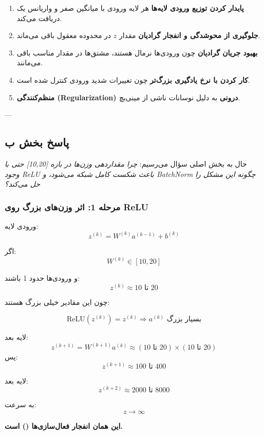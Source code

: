 \documentclass{article}
\begin{document}
\begin{enumerate}
	\item \textbf{پایدار کردن توزیع ورودی لایه‌ها}  
	هر لایه ورودی با میانگین صفر و واریانس یک دریافت می‌کند.
	
	\item \textbf{جلوگیری از محوشدگی و انفجار گرادیان}  
	مقدار $z$ در محدوده معقول باقی می‌ماند.
	
	\item \textbf{بهبود جریان گرادیان}  
	چون ورودی‌ها نرمال هستند، مشتق‌ها در مقدار مناسب باقی می‌مانند.
	
	\item \textbf{کار کردن با نرخ یادگیری بزرگ‌تر}  
	چون تغییرات شدید ورودی کنترل شده است.
	
	\item \textbf{منظم‌کنندگی (Regularization) درونی}  
	به دلیل نوسانات ناشی از مینی‌بچ.
\end{enumerate}

---

\subsection{پاسخ بخش ب}

حال به بخش اصلی سؤال می‌رسیم:  
\emph{چرا مقداردهی وزن‌ها در بازه [10,20] حتی با وجود ReLU باعث شکست کامل شبکه می‌شود، و BatchNorm چگونه این مشکل را حل می‌کند؟}

\subsubsection*{مرحله 1: اثر وزن‌های بزرگ روی ReLU}

ورودی لایه:
\[
z^{(k)} = W^{(k)} a^{(k-1)} + b^{(k)}
\]

اگر:
\[
W^{(k)} \in [10,20]
\]

و ورودی‌ها حدود 1 باشند:
\[
z^{(k)} \approx 10 \text{ تا } 20
\]

چون این مقادیر خیلی بزرگ هستند:

\[
\text{ReLU}(z^{(k)}) = z^{(k)}
\Rightarrow a^{(k)} \text{ بسیار بزرگ}
\]

لایه بعد:
\[
z^{(k+1)} = W^{(k+1)} a^{(k)} \approx (10\text{ تا }20) \times (10\text{ تا }20)
\]
پس:
\[
z^{(k+1)} \approx 100 \text{ تا } 400
\]

لایه بعد:
\[
z^{(k+2)} \approx 2000 \text{ تا } 8000
\]

به سرعت:
\[
z \rightarrow \infty
\]

\textbf{این همان انفجار فعال‌سازی‌ها () است.}
\end{document}

